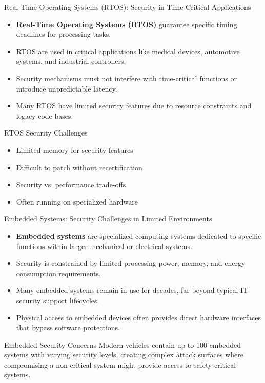 \documentclass{beamer}
\begin{document}
        \begin{frame}{Real-Time Operating Systems (RTOS): Security in Time-Critical Applications}
        \begin{itemize}
        \item \textbf{Real-Time Operating Systems (RTOS)} guarantee specific timing deadlines for processing tasks.
        \item RTOS are used in critical applications like medical devices, automotive systems, and industrial controllers.
        \item Security mechanisms must not interfere with time-critical functions or introduce unpredictable latency.
        \item Many RTOS have limited security features due to resource constraints and legacy code bases.
        \end{itemize}
        
        \begin{block}{RTOS Security Challenges}
        \begin{itemize}
        \item Limited memory for security features
        \item Difficult to patch without recertification
        \item Security vs. performance trade-offs
        \item Often running on specialized hardware
        \end{itemize}
        \end{block}
        \end{frame}

        \begin{frame}{Embedded Systems: Security Challenges in Limited Environments}
            \begin{itemize}
            \item \textbf{Embedded systems} are specialized computing systems dedicated to specific functions within larger mechanical or electrical systems.
            \item Security is constrained by limited processing power, memory, and energy consumption requirements.
            \item Many embedded systems remain in use for decades, far beyond typical IT security support lifecycles.
            \item Physical access to embedded devices often provides direct hardware interfaces that bypass software protections.
            \end{itemize}
            
            \begin{alertblock}{Embedded Security Concerns}
            Modern vehicles contain up to 100 embedded systems with varying security levels, creating complex attack surfaces where compromising a non-critical system might provide access to safety-critical systems.
            \end{alertblock}
            \end{frame}
            
\end{document}
